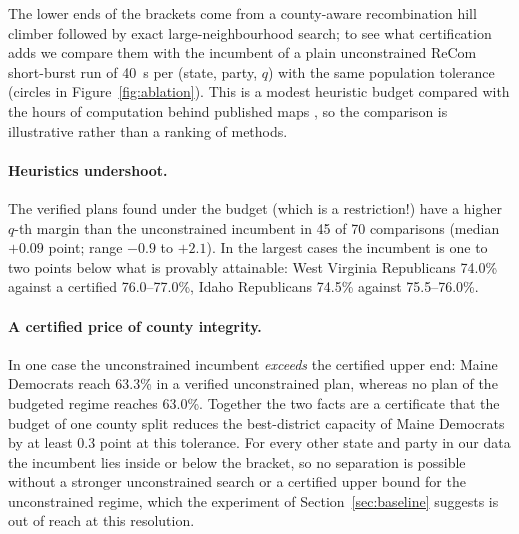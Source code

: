The lower ends of the brackets come from a county-aware recombination hill climber followed by exact large-neighbourhood search; to see what certification adds we compare them with the incumbent of a plain unconstrained ReCom short-burst run of 40~s per (state, party, $q$) with the same population tolerance (circles in Figure~\ref{fig:ablation}). This is a modest heuristic budget compared with the hours of computation behind published maps \citep{atlas2026}, so the comparison is illustrative rather than a ranking of methods.

\paragraph{Heuristics undershoot.}
The verified plans found under the budget (which is a restriction!) have a higher $q$-th margin than the unconstrained incumbent in 45 of 70 comparisons (median $+0.09$ point; range $-0.9$ to $+2.1$). In the largest cases the incumbent is one to two points below what is provably attainable: West Virginia Republicans 74.0\% against a certified 76.0--77.0\%, Idaho Republicans 74.5\% against 75.5--76.0\%.

\paragraph{A certified price of county integrity.}
In one case the unconstrained incumbent \emph{exceeds} the certified upper end: Maine Democrats reach 63.3\% in a verified unconstrained plan, whereas no plan of the budgeted regime reaches 63.0\%. Together the two facts are a certificate that the budget of one county split reduces the best-district capacity of Maine Democrats by at least 0.3 point at this tolerance. For every other state and party in our data the incumbent lies inside or below the bracket, so no separation is possible without a stronger unconstrained search or a certified upper bound for the unconstrained regime, which the experiment of Section~\ref{sec:baseline} suggests is out of reach at this resolution.
